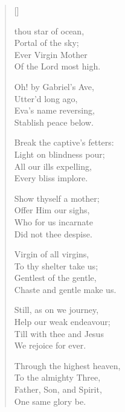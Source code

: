  \newHymn



\settowidth{\versewidth}{Of the Lord most high.}
\begin{multicols}{2}
\begin{verse}[\versewidth]

 thou star of ocean,\\
    Portal of the sky;\\
Ever Virgin Mother\\
    Of the Lord most high.
\pointorig
    
Oh! by Gabriel's Ave,\\
    Utter'd long ago,\\
        Eva's name reversing,\\
    Stablish peace below.
    
Break the captive's fetters:\\
    Light on blindness pour;\\
        All our ills expelling,\\
    Every bliss implore.
    
Show thyself a mother;\\
    Offer Him our sighs,\\
        Who for us incarnate\\
    Did not thee despise.

Virgin of all virgins,\\
    To thy shelter take us;\\
        Gentlest of the gentle,\\
    Chaste  and  gentle  make us.
    

Still, as on we journey,\\
    Help our weak endeavour;\\
        Till with thee and Jesus\\
    We rejoice for ever.
    
Through the highest heaven,\\
    To the almighty Three,\\
        Father, Son, and Spirit,\\
    One same glory be.

\end{verse}
\end{multicols}


